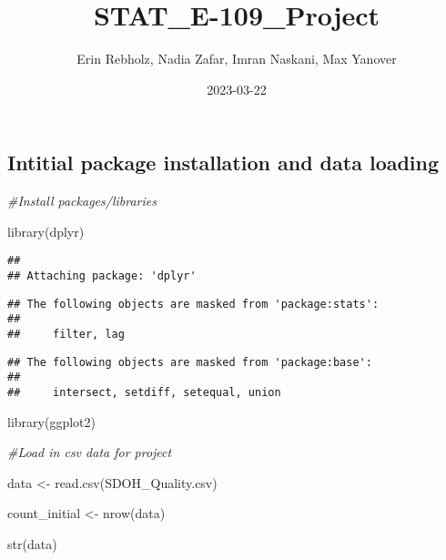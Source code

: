 \documentclass[
]{article}
\title{STAT\_E-109\_Project}
\author{Erin Rebholz, Nadia Zafar, Imran Naskani, Max Yanover}
\date{2023-03-22}
\newenvironment{Shaded}{\begin{snugshade}}{\end{snugshade}}
\newcommand{\CommentTok}[1]{\textcolor[rgb]{0.56,0.35,0.01}{\textit{#1}}}
\newcommand{\FunctionTok}[1]{\textcolor[rgb]{0.00,0.00,0.00}{#1}}
\newcommand{\NormalTok}[1]{#1}
\newcommand{\OtherTok}[1]{\textcolor[rgb]{0.56,0.35,0.01}{#1}}
\newcommand{\StringTok}[1]{\textcolor[rgb]{0.31,0.60,0.02}{#1}}
\begin{document}
\maketitle

\hypertarget{intitial-package-installation-and-data-loading}{%
\subsection{Intitial package installation and data
loading}\label{intitial-package-installation-and-data-loading}}

\begin{Shaded}
\begin{Highlighting}[]
\CommentTok{\#Install packages/libraries}

\FunctionTok{library}\NormalTok{(dplyr)}
\end{Highlighting}
\end{Shaded}

\begin{verbatim}
## 
## Attaching package: 'dplyr'
\end{verbatim}

\begin{verbatim}
## The following objects are masked from 'package:stats':
## 
##     filter, lag
\end{verbatim}

\begin{verbatim}
## The following objects are masked from 'package:base':
## 
##     intersect, setdiff, setequal, union
\end{verbatim}

\begin{Shaded}
\begin{Highlighting}[]
\FunctionTok{library}\NormalTok{(ggplot2)}
\end{Highlighting}
\end{Shaded}

\begin{Shaded}
\begin{Highlighting}[]
\CommentTok{\#Load in csv data for project}

\NormalTok{data }\OtherTok{\textless{}{-}} \FunctionTok{read.csv}\NormalTok{(}\StringTok{\textquotesingle{}SDOH\_Quality.csv\textquotesingle{}}\NormalTok{)}

\NormalTok{count\_initial }\OtherTok{\textless{}{-}} \FunctionTok{nrow}\NormalTok{(data)}

\FunctionTok{str}\NormalTok{(data)}
\end{Highlighting}
\end{Shaded}
\end{document}
